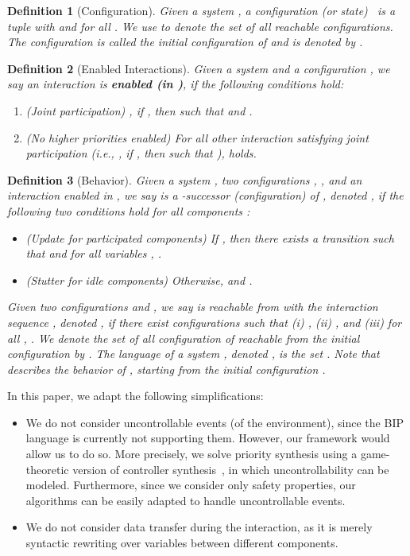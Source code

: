\documentclass[10pt, a4paper, onecolumn, conference, compsocconf]{IEEEtran}
\newtheorem{defi}{Definition}
\begin{document}
\begin{defi}[Configuration]
Given a system , a \emph{configuration (or state)}~ is a tuple  with  and  for all . We use  to denote the set of all reachable configurations.
The configuration  is called the \emph{initial configuration} of  and
is denoted by . \end{defi}

\newcommand{\inter}{\bar{\sigma}}

\begin{defi}[Enabled Interactions]\label{def:semantics}
Given a system  and a configuration ,
we say an interaction  is \textbf{enabled (in )}, if the following conditions hold:
\begin{enumerate}
    \item (Joint participation) , if , then  such that  and  .
    \item (No higher priorities enabled) For all other interaction  satisfying joint participation (i.e., , if , then  such that ),  holds.

\end{enumerate}
\end{defi}

\begin{defi}[Behavior]
  Given a system , two configurations  , , and an interaction  enabled in , we say \emph{ is a -successor (configuration) of }, denoted , if the following two conditions hold for all components :
\begin{itemize}
\item (Update for participated components) If , then there exists a transition  such that  and for all variables , .
\item (Stutter for idle components) Otherwise,  and .
\end{itemize}

Given two configurations  and , we say \emph{ is reachable from } with the interaction sequence  , denoted , if there exist configurations  such that (i) ,
(ii) , and (iii) for all  , .
We denote the set of all configuration of  reachable from the initial configuration  by .
The \emph{language} of a system , denoted , is the set .  Note that  describes the behavior of , starting from the initial configuration .
\end{defi}

\noindent In this paper, we adapt the following simplifications:
\begin{itemize}
\item We do not consider uncontrollable events (of the environment), since the BIP language is currently not supporting them.
However, our framework would allow us to do so.  More precisely, we solve priority synthesis using a game-theoretic version of controller synthesis~\cite{ramadge1989control}, in which uncontrollability can be modeled. Furthermore, since we consider only safety properties, our algorithms can be easily adapted to handle uncontrollable events.  \item We do not consider data transfer during the interaction, as it is merely syntactic rewriting over variables between different components.  \end{itemize}
\end{document}
